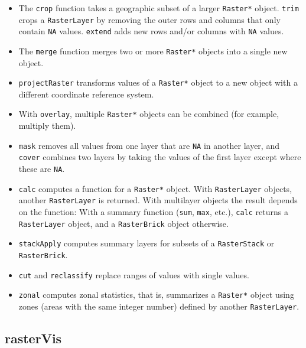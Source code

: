 \documentclass[smallroyalvopaper]{memoir}
\begin{document}
\begin{itemize}
\item The \texttt{crop} function takes a geographic subset of a larger \texttt{Raster*} object. \texttt{trim} crops a \texttt{RasterLayer} by removing the outer rows and columns that only contain \texttt{NA} values. \texttt{extend} adds new rows and/or columns with \texttt{NA} values.

\item The \texttt{merge} function merges two or more \texttt{Raster*} objects into a single new object.

\item \texttt{projectRaster} transforms values of a \texttt{Raster*} object to a new object with a different coordinate reference system.

\item With \texttt{overlay}, multiple \texttt{Raster*} objects can be combined (for example, multiply them).

\item \texttt{mask} removes all values from one layer that are \texttt{NA} in another layer, and \texttt{cover} combines two layers by taking the values of the first layer except where these are \texttt{NA}.

\item \texttt{calc} computes a function for a \texttt{Raster*} object. With \texttt{RasterLayer} objects, another \texttt{RasterLayer} is returned. With multilayer objects the result depends on the function: With a summary function (\texttt{sum}, \texttt{max}, etc.), \texttt{calc} returns a \texttt{RasterLayer} object, and a \texttt{RasterBrick} object otherwise.

\item \texttt{stackApply} computes summary layers for subsets of a \texttt{RasterStack} or \texttt{RasterBrick}.

\item \texttt{cut} and \texttt{reclassify} replace ranges of values with single values.

\item \texttt{zonal} computes zonal statistics, that is, summarizes a \texttt{Raster*} object using zones (areas with the same integer number) defined by another \texttt{RasterLayer}.
\end{itemize}

\subsection{rasterVis}
\label{sec:orgheadline26}
\label{sec:rasterVis}
\end{document}
